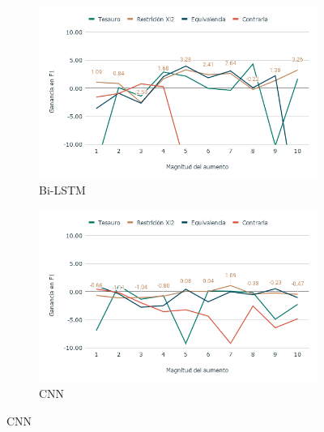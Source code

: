 \begin{figure}[hbt!]
    \begin{subfigure}[b]{0.5\textwidth}
        \includegraphics[width=\textwidth]{sections/figures/bi_LSTMAnox.png}
        \caption{Bi-LSTM}
    \end{subfigure}
    \hfill
    \begin{subfigure}[b]{0.5\textwidth}
        \includegraphics[width=\textwidth]{sections/figures/CNNAnox.png}
        \caption{CNN}
    \end{subfigure}
    \hfill
    
    


\end{figure}
